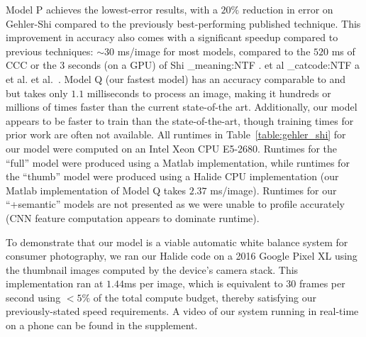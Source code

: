 \documentclass[10pt,twocolumn,letterpaper]{article}
\makeatletter
\newcommand\latinabbrev[1]{
  \peek_meaning:NTF . {%
    #1\@}%
  { \peek_catcode:NTF a {%
      #1.\@ }%
    {#1.\@}}}
\def\etal{\latinabbrev{et al}}
\makeatother
\begin{document}
Model P achieves the lowest-error results,
with a $20\%$ reduction in error on Gehler-Shi compared to the previously best-performing published technique.
This improvement in accuracy also comes with a significant speedup compared to
previous techniques: $\sim\!30$ ms/image for most models, compared to the $520$ ms of CCC
\cite{BarronICCV2015} or the $3$ seconds (on a GPU) of Shi \etal\ \cite{ShiECCV2016}.
Model Q (our fastest model) has an accuracy comparable to
\cite{BarronICCV2015} and \cite{ShiECCV2016} but takes only $1.1$ milliseconds
to process an image, making it hundreds or millions of times faster than the
current state-of-the art.
Additionally, our model appears to be faster to train than the state-of-the-art,
though training times for prior work are often not available.
All runtimes in Table~\ref{table:gehler_shi} for our model were computed on an
Intel Xeon CPU E5-2680.
Runtimes for the ``full'' model were produced using a
Matlab implementation, while runtimes for the ``thumb'' model were produced
using a Halide \cite{RaganKelley2012} CPU implementation
(our Matlab implementation of Model Q takes $2.37$ ms/image).
Runtimes for our ``+semantic'' models are not presented as we were unable to
profile \cite{Wang2014} accurately (CNN feature computation appears to dominate
runtime).

To demonstrate that our model is a viable automatic white
balance system for consumer photography, we ran our Halide code on a
2016 Google Pixel XL using the thumbnail images
computed by the device's camera stack.
This implementation ran at $1.44$ms per image, which is equivalent
to $30$ frames per second using $< 5\%$ of the total compute
budget, thereby satisfying our previously-stated speed requirements.
A video of our system running in real-time on a phone can be found in the
supplement.
\end{document}
